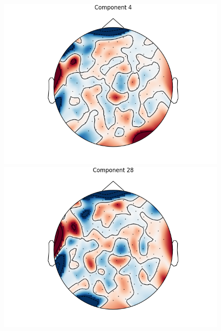 \documentclass[utf8]{frontiersSCNS} %
\begin{document}
\begin{figure}[h!]
  \begin{minipage}{0.31\textwidth}
    \centering\includegraphics[width=\linewidth]{max_act/4.png}
     \subcaption{}
  \end{minipage}
  \hspace*{\fill} %
  \begin{minipage}{0.31\textwidth}
    \includegraphics[width=\linewidth]{max_act/28.png}
     \subcaption{}
  \end{minipage}
   \hspace*{\fill} %
   \begin{minipage}{0.31\textwidth}

\end{minipage}
\end{figure}
\end{document}
